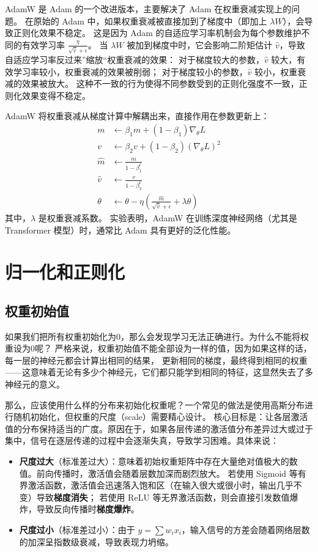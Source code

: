 AdamW 是 Adam 的一个改进版本，主要解决了 Adam 在权重衰减实现上的问题。
在原始的 Adam 中，如果权重衰减被直接加到了梯度中（即加上 $\lambda W$），会导致正则化效果不稳定。
这是因为 Adam 的自适应学习率机制会为每个参数维护不同的有效学习率 $\frac{\eta}{\sqrt{\hat{v}} + \epsilon}$。
当 $\lambda W$ 被加到梯度中时，它会影响二阶矩估计 $\hat{v}$，导致自适应学习率反过来”缩放“权重衰减的效果：
对于梯度较大的参数，$\hat{v}$ 较大，有效学习率较小，权重衰减的效果被削弱；
对于梯度较小的参数，$\hat{v}$ 较小，权重衰减的效果被放大。
这种不一致的行为使得不同参数受到的正则化强度不一致，正则化效果变得不稳定。

AdamW 将权重衰减从梯度计算中解耦出来，直接作用在参数更新上：
\begin{align*}
	m       & \leftarrow \beta_1 m + (1 - \beta_1) \nabla_\theta L                                               \\
	v       & \leftarrow \beta_2 v + (1 - \beta_2) (\nabla_\theta L)^2                                           \\
	\hat{m} & \leftarrow \frac{m}{1 - \beta_1^t}                                                                 \\
	\hat{v} & \leftarrow \frac{v}{1 - \beta_2^t}                                                                 \\
	\theta  & \leftarrow \theta - \eta \left( \frac{\hat{m}}{\sqrt{\hat{v}} + \epsilon} + \lambda \theta \right)
\end{align*}
其中，$\lambda$ 是权重衰减系数。
实验表明，AdamW 在训练深度神经网络（尤其是 Transformer 模型）时，通常比 Adam 具有更好的泛化性能。

\section{归一化和正则化}
\subsection{权重初始值}
如果我们把所有权重初始化为0，那么会发现学习无法正确进行。为什么不能将权重设为0呢？
严格来说，权重初始值不能全部设为一样的值，因为如果这样的话，每一层的神经元都会计算出相同的结果，
更新相同的梯度，最终得到相同的权重——这意味着无论有多少个神经元，它们都只能学到相同的特征，这显然失去了多神经元的意义。

那么，应该使用什么样的分布来初始化权重呢？一个常见的做法是使用高斯分布进行随机初始化，但权重的尺度（scale）需要精心设计。
核心目标是：让各层激活值的分布保持适当的广度。原因在于，如果各层传递的激活值分布差异过大或过于集中，信号在逐层传递的过程中会逐渐失真，导致学习困难。具体来说：
\begin{itemize}
	\item \textbf{尺度过大}（标准差过大）：意味着初始权重矩阵中存在大量绝对值极大的数值。前向传播时，激活值会随着层数加深而剧烈放大。
	      若使用 Sigmoid 等有界激活函数，激活值会迅速落入饱和区（在输入很大或很小时，输出几乎不变）导致\textbf{梯度消失}；
	      若使用 ReLU 等无界激活函数，则会直接引发数值爆炸，导致反向传播时\textbf{梯度爆炸}。
	\item \textbf{尺度过小}（标准差过小）：由于 $y = \sum w_i x_i$，输入信号的方差会随着网络层数的加深呈指数级衰减，导致表现力坍缩。
\end{itemize}

